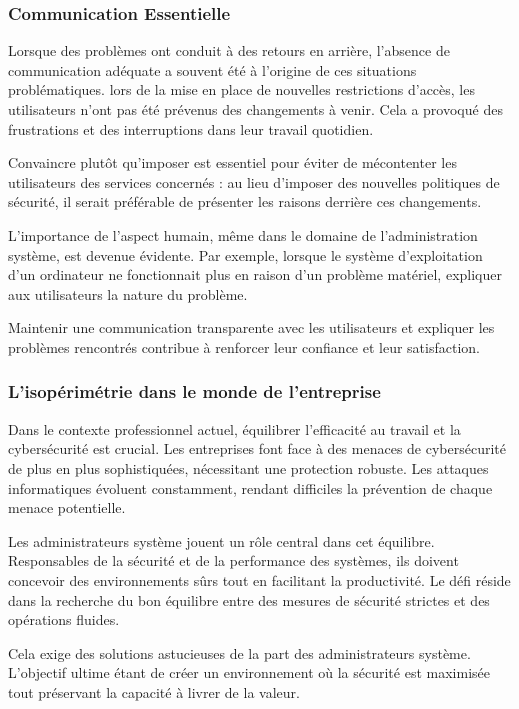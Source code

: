 \subsubsection{Communication Essentielle}
Lorsque des problèmes ont conduit à des retours en arrière, l'absence de communication adéquate a souvent été à l'origine de ces situations problématiques.
lors de la mise en place de nouvelles restrictions d'accès, les utilisateurs n'ont pas été prévenus des changements à venir.
Cela a provoqué des frustrations et des interruptions dans leur travail quotidien.

Convaincre plutôt qu'imposer est essentiel pour éviter de mécontenter les utilisateurs des services concernés : au lieu d'imposer des nouvelles politiques de sécurité, il serait préférable de présenter les raisons derrière ces changements.

L'importance de l'aspect humain, même dans le domaine de l'administration système, est devenue évidente.
Par exemple, lorsque le système d'exploitation d'un ordinateur ne fonctionnait plus en raison d'un problème matériel, expliquer aux utilisateurs la nature du problème.

Maintenir une communication transparente avec les utilisateurs et expliquer les problèmes rencontrés contribue à renforcer leur confiance et leur satisfaction.

\subsubsection{L'isopérimétrie dans le monde de l'entreprise}
Dans le contexte professionnel actuel, équilibrer l'efficacité au travail et la cybersécurité est crucial.
Les entreprises font face à des menaces de cybersécurité de plus en plus sophistiquées, nécessitant une protection robuste.
Les attaques informatiques évoluent constamment, rendant difficiles la prévention de chaque menace potentielle.

Les administrateurs système jouent un rôle central dans cet équilibre.
Responsables de la sécurité et de la performance des systèmes, ils doivent concevoir des environnements sûrs tout en facilitant la productivité.
Le défi réside dans la recherche du bon équilibre entre des mesures de sécurité strictes et des opérations fluides.

Cela exige des solutions astucieuses de la part des administrateurs système.
L'objectif ultime étant de créer un environnement où la sécurité est maximisée tout préservant la capacité à livrer de la valeur.

